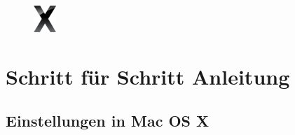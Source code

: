 \documentclass[a4paper,12pt]{scrartcl}
\begin{document}
\pagebreak

\begin{figure}[t!]
    \raggedleft
    \vspace{-20pt}
    \includegraphics[height=1cm,keepaspectratio]{Bilder/OSXLeopard}
    \vspace{-30pt}
\end{figure}

\section*{Schritt für Schritt Anleitung}
\subsection*{Einstellungen in Mac OS X}
\end{document}

